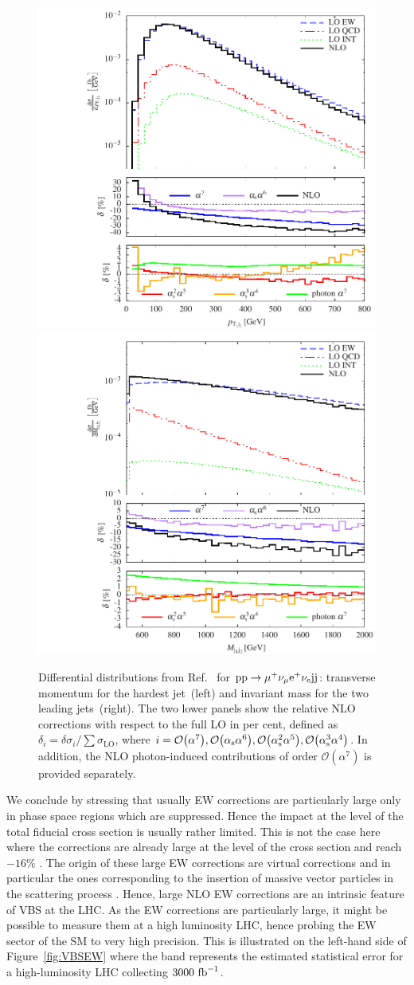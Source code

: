 \begin{figure}
\includegraphics[width=.47\textwidth]{WG1_plots/histogram_transverse_momentum_j1}
\hfill
\includegraphics[width=.47\textwidth]{WG1_plots/histogram_invariant_mass_mjj12}
\caption{Differential distributions from Ref.~\cite{Biedermann:2017bss} for ${\rm p}{\rm p}\to\mu^+\nu_\mu{\rm e}^+\nu_{\rm e}{\rm j}{\rm j}$:
transverse momentum for the hardest jet~(left) and invariant mass for the two leading jets~(right).
The two lower panels show the relative NLO corrections with respect to the full LO in per cent,
defined as $\delta_i = \delta \sigma_{i} / \sum \sigma_{\text{LO}}$, 
where $i=\mathcal{O}{\left(\alpha^{7}\right)},\mathcal{O}{\left(\alpha_{\rm s}\alpha^{6}\right)},\mathcal{O}{\left(\alpha_{\rm s}^2\alpha^{5}\right)},\mathcal{O}{\left(\alpha_{\rm s}^3\alpha^{4}\right)}$.
In addition, the NLO photon-induced contributions of order $\mathcal{O}{\left(\alpha^{7}\right)}$ is provided separately.}
\label{fig:VBSALL}
\end{figure}

We conclude by stressing that usually EW corrections are particularly large only in phase space regions which are suppressed.
Hence the impact at the level of the total fiducial cross section is usually rather limited.
This is not the case here where the corrections are already large at the level of the cross section and reach $-16\%$ \cite{Biedermann:2016yds}.
The origin of these large EW corrections are virtual corrections and in particular the ones corresponding to the insertion of massive vector particles in the scattering process \cite{Biedermann:2016yds}.
Hence, large NLO EW corrections are an intrinsic feature of VBS at the LHC.
As the EW corrections are particularly large, it might be possible to measure them at a high luminosity LHC, hence probing the EW sector of the SM to very high precision.
This is illustrated on the left-hand side of Figure~\ref{fig:VBSEW} where the band represents the estimated statistical error for a high-luminosity LHC collecting $3000~{\rm fb}^{-1}$.

